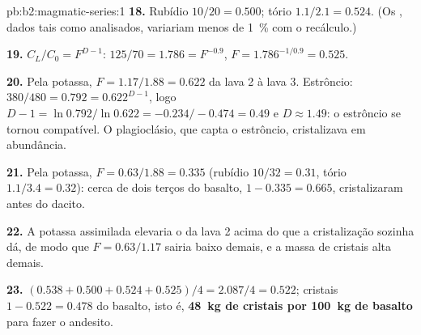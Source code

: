 \begin{solution}{pb:b2:magmatic-series:1}
\textbf{18.} Rubídio $10/20 = 0.500$; tório $1.1/2.1 = 0.524$. (Os ,
dados tais como analisados, variariam menos de \qty{1}{\percent} com o
recálculo.)

\textbf{19.} $C_L/C_0 = F^{D - 1}$: $125/70 = 1.786 = F^{-0.9}$, $F = 1.786^{-1/0.9} =
0.525$.

\textbf{20.} Pela potassa, $F = 1.17/1.88 = 0.622$ da lava 2 à lava 3. Estrôncio:
$380/480 = 0.792 = 0.622^{D - 1}$, logo $D - 1 = \ln 0.792/\ln 0.622 = -0.234/-0.474 =
0.49$ e $D \approx 1.49$: o estrôncio se tornou compatível. O plagioclásio, que capta o
estrôncio, cristalizava em abundância.

\textbf{21.} Pela potassa, $F = 0.63/1.88 = 0.335$ (rubídio $10/32 = 0.31$, tório
$1.1/3.4 = 0.32$): cerca de dois terços do basalto, $1 - 0.335 = 0.665$, cristalizaram
antes do dacito.

\textbf{22.} A potassa assimilada elevaria o  da lava 2 acima do que a
cristalização sozinha dá, de modo que $F = 0.63/1.17$ sairia baixo demais, e a massa de
cristais alta demais.

\textbf{23.} $(0.538 + 0.500 + 0.524 + 0.525)/4 = 2.087/4 = 0.522$; cristais $1 - 0.522
= 0.478$ do basalto, isto é, \textbf{\qty[text-series-to-math=true]{48}{kg} de
cristais por \qty{100}{kg} de basalto} para fazer o andesito.
\end{solution}
